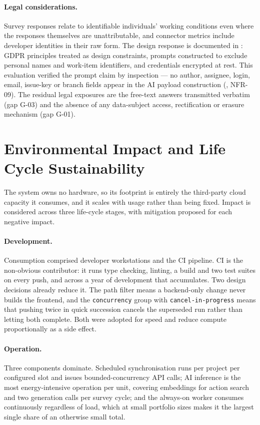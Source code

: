 \paragraph{Legal considerations.} Survey responses relate to identifiable
individuals' working conditions even where the responses themselves are
unattributable, and connector metrics include developer identities in their raw
form. The design response is documented in : GDPR
principles treated as design constraints, prompts constructed to exclude
personal names and work-item identifiers, and credentials encrypted at rest.
This evaluation verified the prompt claim by inspection --- no author, assignee,
login, email, issue-key or branch fields appear in the AI payload construction
(, NFR-09). The residual legal exposures are the free-text
answers transmitted verbatim (gap G-03) and the absence of any data-subject
access, rectification or erasure mechanism (gap G-01).

\section{Environmental Impact and Life Cycle Sustainability}
\label{sec:environment}
\label{sec:sustainability}

The system owns no hardware, so its footprint is entirely the third-party cloud
capacity it consumes, and it scales with usage rather than being fixed. Impact
is considered across three life-cycle stages, with mitigation proposed for each
negative impact.

\paragraph{Development.} Consumption comprised developer workstations and the CI
pipeline. CI is the non-obvious contributor: it runs type checking, linting, a
build and two test suites on every push, and across a year of development that
accumulates. Two design decisions already reduce it. The path filter means a
backend-only change never builds the frontend, and the \texttt{concurrency}
group with \texttt{cancel-in-progress} means that pushing twice in quick
succession cancels the superseded run rather than letting both complete. Both
were adopted for speed and reduce compute proportionally as a side effect.

\paragraph{Operation.} Three components dominate. Scheduled synchronisation runs
per project per configured slot and issues bounded-concurrency API calls; AI
inference is the most energy-intensive operation per unit, covering embeddings
for action search and two generation calls per survey cycle; and the always-on
worker consumes continuously regardless of load, which at small portfolio sizes
makes it the largest single share of an otherwise small total.

